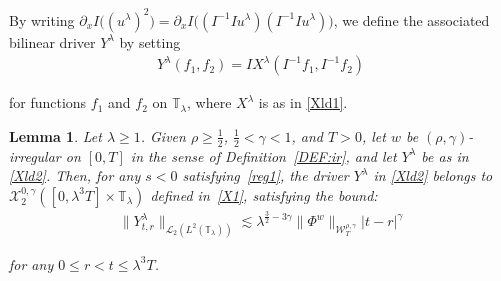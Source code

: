 \documentclass[letterpaper, 11pt,  reqno]{amsart}
\newtheorem{lemma}[theorem]{Lemma}
\newcommand{\1}{\hspace{0.5mm}\text{I}\hspace{0.5mm}}
\newcommand{\noi}{\noindent}
\newcommand{\T}{\mathbb{T}}
\newcommand{\g}{\gamma}
\newcommand{\ld}{\lambda}
\newcommand{\les}{\lesssim}
\newcommand{\cL}{\mathcal{L}}
\newcommand{\cX}{\mathcal{X}}
\newcommand{\W}{\mathcal{W}}
\numberwithin{equation}{section}
\numberwithin{theorem}{section}
\begin{document}
\noi
By  writing
$\partial_x I\big((u^{\ld} )^2\big) = \partial_x I\big((I^{-1}Iu^{\ld} )(I^{-1}Iu^{\ld} )\big)$, 
we define the associated bilinear driver $Y^\ld$ by setting
\begin{align}
Y^\ld (f_1, f_2) = I X^{\ld} (I^{-1} f _1,  I^{-1} f _2)
\label{Xld2}
\end{align}


\noi
for functions $f_1$ and $f_2$ on $\T_\ld$, 
where $X^\ld$ is as in \eqref{Xld1}.









\begin{lemma}
\label{LEM:tri4}
Let $\ld \ge 1$.
Given $\rho \ge\frac 12$,  $\frac 12 < \g < 1$,  and $T> 0$, 
let  $w$ be $(\rho,\g)$-irregular on $[0, T]$ in the sense of Definition~\ref{DEF:ir}, 
and let $Y^\ld$ be as in \eqref{Xld2}.
Then, for any $s < 0$
satisfying~\eqref{reg1}, 
the driver $Y^\ld$  in \eqref{Xld2}
belongs to $ \cX^{0, \g}_2([0, \ld^3T] \times \T_\ld)$ defined in~\eqref{X1}, 
satisfying the bound\textup{:}
\begin{align}
 \| Y^{\ld}_{t,r}  \|_{\cL_2 ( L^2(\T_\ld)) }
 \les
 \ld^{ \frac32  -3\g} 
  \|\Phi^{w}\|_{\W_{T}^{\rho, \g}}
 |t-r|^{\g}
\label{IF1}
\end{align}


\noi
for any $0\leq r<t \leq \ld^3T$.


\end{lemma}
\end{document}
